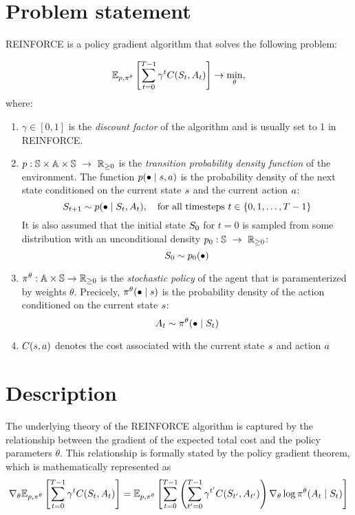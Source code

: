 \documentclass[12pt,twoside]{../../mitthesis}
\begin{document}
\section*{Problem statement}
REINFORCE is a policy gradient algorithm that solves the following problem:

\begin{equation}
    \label{eqn_reinforce_problem}
    \E[\transit, \policy^{\theta}]{\sum_{t = 0}^{T-1} \gamma ^ t \Cost(\State_{t}, \Action_{t})} \ra \min_{\theta},
\end{equation}
where:
\begin{enumerate}
    \item $\gamma \in [0, 1]$ is the \textit{discount factor} of the algorithm and is usually set to 1 in REINFORCE. 
    \item  $p : \mathbb S \times \mathbb A \times \mathbb S \ \rightarrow \ {\mathbb{R}}_{\geq 0}$ is the \textit{transition probability density function} of the environment. The function $p(\bullet \mid s, a)$ is the probability density of the next state conditioned on the current state $s$ and the current action $a$:
    $$
        S_{t+1} \sim p(\bullet \mid S_t, A_t), \quad \text{for all timesteps } t \in \{0, 1, \dots, T-1\} 
    $$
    It is also assumed that the initial state $S_0$ for $t = 0$ is sampled from some distribution with an unconditional density $p_0 : \mathbb S \ \rightarrow \ {\mathbb{R}}_{\geq 0}$:
    $$
        S_0 \sim p_0(\bullet)
    $$
    \item $\pi^{\theta} : \mathbb A \times \mathbb S \rightarrow {\mathbb{R}}_{\geq 0}$ is the \textit{stochastic policy} of the agent that is paramenterized by weights $\theta$. Precicely, $\pi^{\theta}(\bullet \mid s)$ is the probability density of the action conditioned on the current state $s$:
    $$
        A_t \sim \pi^{\theta}(\bullet \mid S_t)
    $$
    \item $C(s, a)$ denotes the cost associated with the current state $s$ and action $a$
\end{enumerate}

\section*{Description}
The underlying theory of the REINFORCE algorithm is captured by the relationship between the gradient of the expected total cost and the policy parameters $\theta$. 
This relationship is formally stated by the policy gradient theorem, which is mathematically represented as
\begin{equation}
    \label{eqn_reinforce_log_lh_trick}
    \nabla_{\theta} \E[\transit, \policy^{\theta}]{\sum_{t = 0}^{T-1} \gamma ^ t \Cost(\State_{t}, \Action_{t})} =  \E[\transit, \policy^{\theta}]{ \sum_{t = 0}^{T-1}\left(\sum_{t' = 0}^{T-1} \gamma ^ {t'} \Cost(\State_{t'}, \Action_{t'})\right)  \nabla_{\theta}\log \policy^{\theta}(\Action_t \mid \State_t)}
\end{equation}
\end{document}
